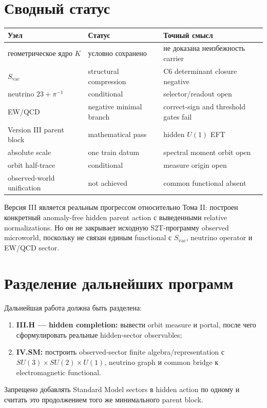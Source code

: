 \section{Сводный статус}

\begin{center}
\begin{tabular}{p{}p{}p{}}
\toprule
Узел & Статус & Точный смысл \\
\midrule
геометрическое ядро \(K\) & условно сохранено & не доказана неизбежность carrier \\
\(S_{\mathrm{vac}}\) & structural compression & C6 determinant closure negative \\
neutrino \(23+\pi^{-1}\) & conditional & selector/readout open \\
EW/QCD & negative minimal branch & correct-sign and threshold gates fail \\
Version III parent block & mathematical pass & hidden \(U(1)\) EFT \\
absolute scale & one train datum & spectral moment orbit open \\
orbit half-trace & conditional & measure origin open \\
observed-world unification & not achieved & common functional absent \\
\bottomrule
\end{tabular}
\end{center}

\begin{theorem}
Версия III является реальным прогрессом относительно Тома II: построен
конкретный anomaly-free hidden parent action с выведенными relative
normalizations. Но он не закрывает исходную S2T-программу observed
microworld, поскольку не связан единым functional с \(S_{\mathrm{vac}}\),
neutrino operator и EW/QCD sector.
\end{theorem}

\section{Разделение дальнейших программ}

Дальнейшая работа должна быть разделена:
\begin{enumerate}
 \item \textbf{III.H --- hidden completion:} вывести orbit measure и
 portal, после чего сформулировать реальные hidden-sector observables;
 \item \textbf{IV.SM:} построить observed-sector finite
 algebra/representation с
 \(SU(3)\times SU(2)\times U(1)\), neutrino graph и common bridge к
 electromagnetic functional.
\end{enumerate}
Запрещено добавлять Standard Model sectors в hidden action по одному и
считать это продолжением того же минимального parent block.

